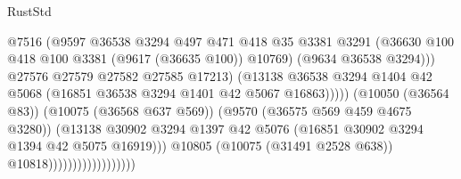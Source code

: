 \begin{lexlean}{RustStd}
\begin{coremodule}
                                                    @7516
                                                    (@9597
                                                      @36538
                                                      @3294
                                                      @497
                                                      @471
                                                      @418
                                                      @35
                                                      @3381
                                                      @3291
                                                      (@36630
                                                        @100
                                                        @418
                                                        @100
                                                        @3381
                                                        (@9617 (@36635 @100))
                                                        @10769)
                                                      (@9634 @36538 @3294)))
                                                  @27576
                                                  @27579
                                                  @27582
                                                  @27585
                                                  @17213)
                                                (@13138
                                                  @36538
                                                  @3294
                                                  @1404
                                                  @42
                                                  @5068
                                                  (@16851 @36538 @3294 @1401 @42 @5067 @16863)))))
                                          (@10050 (@36564 @83))
                                          (@10075 (@36568 @637 @569))
                                          (@9570 (@36575 @569 @459 @4675 @3280))
                                          (@13138
                                            @30902
                                            @3294
                                            @1397
                                            @42
                                            @5076
                                            (@16851 @30902 @3294 @1394 @42 @5075 @16919)))
                                        @10805
                                        (@10075 (@31491 @2528 @638))
                                        @10818))))))))))))))))))

\end{coremodule}
\end{lexlean}
